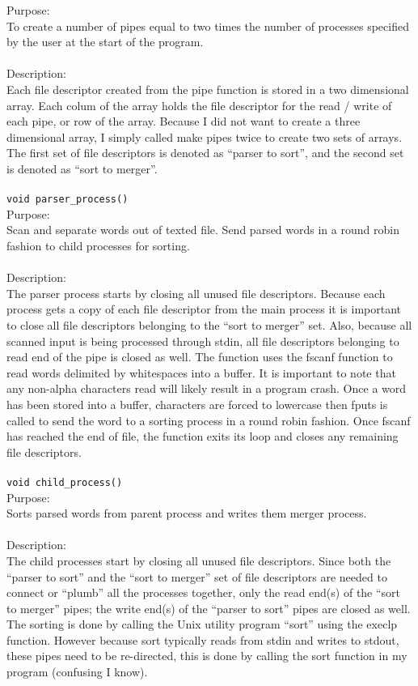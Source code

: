 \documentclass[12pt,letterpaper]{article}
\begin{document}
Purpose:
\\
To create a number of pipes equal to two times the number of processes specified by the user at the start of the program.
\\\\
Description:
\\
Each file descriptor created from the pipe function is stored in a two dimensional array. Each colum of the array holds the file descriptor for the read / write of each pipe, or row of the array. Because I did not want to create a three dimensional array, I simply called make pipes twice to create two sets of arrays. The first set of file descriptors is denoted as ``parser to sort'', and the second set is denoted as ``sort to merger''. 
\\\\
\texttt{void parser\_process()}
\\
Purpose:
\\
Scan and separate words out of texted file. Send parsed words in a round robin fashion to child processes for sorting.
\\\\
Description:
\\
The parser process starts by closing all unused file descriptors. Because each process gets a copy of each file descriptor from the main process it is important to close all file descriptors belonging to the ``sort to merger'' set. Also, because all scanned input is being processed through stdin, all file descriptors belonging to read end of the pipe is closed as well. The function uses the fscanf function to read words delimited by whitespaces into a buffer. It is important to note that any non-alpha characters read will likely result in a program crash. Once a word has been stored into a buffer, characters are forced to lowercase then fputs is called to send the word to a sorting process in a round robin fashion. Once fscanf has reached the end of file, the function exits its loop and closes any remaining file descriptors.
\\\\
\texttt{void child\_process()}
\\
Purpose:
\\
Sorts parsed words from parent process and writes them merger process.
\\\\
Description:
\\
The child processes start by closing all unused file descriptors. Since both the ``parser to sort'' and the ``sort to merger'' set of file descriptors are needed to connect or ``plumb'' all the processes together, only the read end(s) of the ``sort to merger'' pipes; the write end(s) of the ``parser to sort'' pipes are closed as well. The sorting is done by calling the Unix utility program ``sort'' using the execlp function. However because sort typically reads from stdin and writes to stdout, these pipes need to be re-directed, this is done by calling the sort function in my program (confusing I know).
\end{document}
